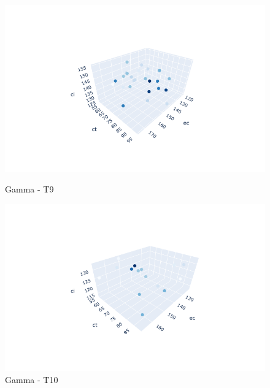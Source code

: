 \documentclass{hust}
\begin{document}
\begin{itemize}
	\begin{figure}[H]
		\begin{minipage}{0.5\textwidth}
			\centering
			\includegraphics[width=1.2\linewidth]{images/ga-dem9.png}
			\caption{Gamma - T9}\label{fig:nsga-ii-ga-dem9}
		\end{minipage}\hfill
		\begin{minipage}{0.5\textwidth}
			\centering
			\includegraphics[width=1.2\linewidth]{images/ga-dem10.png}
			\caption{Gamma - T10}\label{fig:nsga-ii-ga-dem10}
		\end{minipage}
	\end{figure}
	

\end{itemize}
\end{document}
